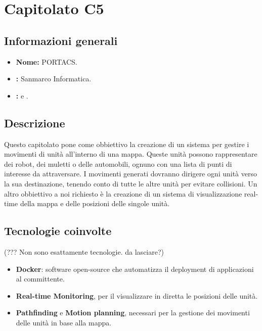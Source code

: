 \section{Capitolato C5}

\subsection{Informazioni generali}
\begin{itemize}
\item \textbf{Nome:} PORTACS.
\item \textbf{\commitProg:} Sanmarco Informatica.
\item \textbf{\proponProg:} \VT{} e \CR.
\end{itemize}

\subsection{Descrizione}
Questo capitolato pone come obbiettivo la creazione di un sistema per gestire i movimenti di unità all'interno di una mappa. Queste unità possono rappresentare dei robot, dei muletti o delle automobili, ognuno con una lista di punti di interesse da attraversare. I movimenti generati dovranno dirigere ogni unità verso la sua destinazione, tenendo conto di tutte le altre unità per evitare collisioni.
Un altro obbiettivo a noi richiesto è la creazione di un sistema di visualizzazione real-time della mappa e delle posizioni delle singole unità.

\subsection{Tecnologie coinvolte}
(??? Non sono esattamente tecnologie. da lasciare?)
\begin{itemize}
\item \textbf{Docker}: software open-source che automatizza il deployment di applicazioni al committente.
\item \textbf{Real-time Monitoring}, per il visualizzare in diretta le posizioni delle unità.
\item \textbf{Pathfinding} e \textbf{Motion planning}, necessari per la gestione dei movimenti delle unità in base alla mappa.
\end{itemize}

